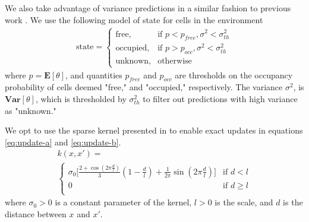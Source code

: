 \documentclass[portrait,final,archD,fontscale=0.477]{baposter}
\begin{document}
\begin{poster}
{We also take advantage of variance predictions in a similar fashion to previous work \cite{jwang}. We use the following model of state for cells in the environment
\begin{align}
	\text{state} = \begin{cases} \text{free,} & \text{if }p < p_{free}, \sigma^2 < \sigma^2_{th} \\
	\text{occupied,} & \text{if } p > p_{occ}, \sigma^2 < \sigma^2_{th} \\
	\text{unknown,} & \text{otherwise} \end{cases}
\end{align}
where $p = \mathbf{E}[\theta]$, and quantities $p_{free}$ and $p_{occ}$ are thresholds on the occupancy probability of cells deemed "free," and "occupied," respectively. The variance $\sigma^2$, is $\mathbf{Var}[\theta]$, which is thresholded by $\sigma^2_{th}$ to filter out predictions with high variance as "unknown."

We opt to use the sparse kernel presented in \cite{sparsekernel} to enable exact updates in equations \ref{eq:update-a} and \ref{eq:update-b}.
\begin{multline}
    k(x,x') = \\ \begin{cases}
        \sigma_0\big[\frac{2 + \cos(2\pi\frac{d}{l})}{3}(1 - \frac{d}{l}) + \frac{1}{2\pi}\sin(2\pi\frac{d}{l})\big] & \text{if } d < l\\
        0 & \text{if } d\geq l\\ \label{eq:sparse-kern}
        \end{cases}
\end{multline}
where $\sigma_0 > 0$ is a constant parameter of the kernel, $l > 0$ is the scale, and $d$ is the distance between $x$ and $x'$. 
}

\end{poster}
\end{document}
